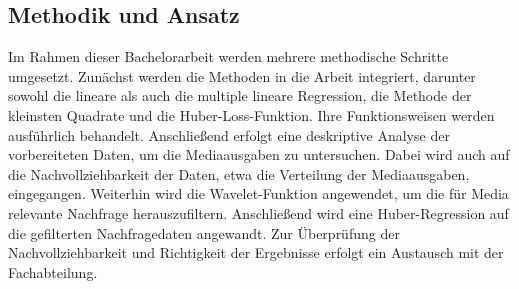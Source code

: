 \subsection{Methodik und Ansatz}
\label{MethodikUndAnsatz}
Im Rahmen dieser Bachelorarbeit werden mehrere methodische Schritte umgesetzt. Zunächst werden die Methoden in die Arbeit integriert, darunter sowohl die lineare als auch die multiple lineare Regression, die Methode der kleinsten Quadrate und die Huber-Loss-Funktion. Ihre Funktionsweisen werden ausführlich behandelt. Anschließend erfolgt eine deskriptive Analyse der vorbereiteten Daten, um die Mediaausgaben zu untersuchen. Dabei wird auch auf die Nachvollziehbarkeit der Daten, etwa die Verteilung der Mediaausgaben, eingegangen. Weiterhin wird die Wavelet-Funktion angewendet, um die für Media relevante Nachfrage herauszufiltern. Anschließend wird eine Huber-Regression auf die gefilterten Nachfragedaten angewandt. Zur Überprüfung der Nachvollziehbarkeit und Richtigkeit der Ergebnisse erfolgt ein Austausch mit der Fachabteilung.
